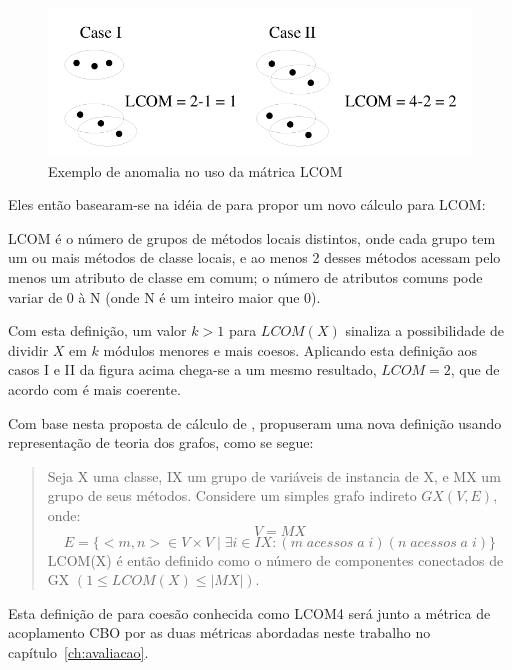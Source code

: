 \begin{figure}[h]
\center
\includegraphics[scale=0.4]{imagens/exemplo-anomalia-lcom1-hitz-e-montazeri}
\caption{Exemplo de anomalia no uso da mátrica LCOM \cite{measuringCouplingAndCohesion}}
\label{fig:exemplo-anomalia-lcom1}
\end{figure}

Eles então basearam-se na idéia de
 para propor um novo cálculo para
LCOM:

\begin{citacao}
LCOM é o número de grupos de métodos locais distintos, onde cada grupo tem um
ou mais métodos de classe locais, e ao menos 2 desses métodos acessam pelo
menos um atributo de classe em comum; o número de atributos comuns pode variar
de 0 à N (onde N é um inteiro maior que 0).
\cite{principalComponentAnalysisOfLCOM}
\end{citacao}

Com esta definição, um valor $k > 1$ para $LCOM(X)$ sinaliza a possibilidade de
dividir $X$ em $k$ módulos menores e mais coesos. Aplicando esta definição aos
casos I e II da figura acima chega-se a um mesmo resultado, $LCOM = 2$, que de
acordo com  é mais coerente.

Com base nesta proposta de cálculo de
,
 propuseram uma nova definição usando
representação de teoria dos grafos, como se segue:

\begin{quotation}
Seja X uma classe, IX um grupo de variáveis de instancia de X, e MX um grupo
de seus métodos. Considere um simples grafo indireto $GX(V, E)$, onde: $$V =
MX$$ $$E = \{<m, n> \in V \times V \mid \exists i \in IX: (m \; acessos \; a \;
i) (n \; acessos \; a \; i)\}$$ LCOM(X) é então definido como o número de componentes
conectados de GX $(1 \leq LCOM(X) \leq |MX|)$.
\end{quotation}

Esta definição de  para coesão
conhecida como LCOM4 será junto a métrica de acoplamento CBO por
 as duas métricas abordadas neste trabalho no
capítulo~\ref{ch:avaliacao}.

